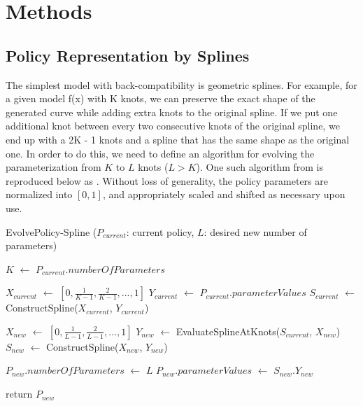 \section{Methods}

\subsection{Policy Representation by Splines}
The simplest model with back-compatibility is geometric
splines.  For example, for a given model f(x) with K knots, we can preserve the
exact shape of the generated curve while adding extra knots to the
original spline. If we put one additional knot between every two
consecutive knots of the original spline, we end up with a 2K - 1
knots and a spline that has the same shape as the original one. In
order to do this, we need to define an algorithm for evolving the
parameterization from $K$ to $L$ knots ($L > K$). One such algorithm from
\cite{kormushev2011bipedal-walking-energy} is reproduced below as .
Without loss of generality, the policy parameters are
normalized into $[0, 1]$, and appropriately scaled and shifted as necessary upon use.

\begin{algorithm}
\caption{EvolvePolicy-Spline ($P_{current}$: current policy, $L$: desired new number of parameters)}
\begin{algorithmic}[1]

\STATE $K$ $\leftarrow$ $P_{current}.numberOfParameters$

\STATE $X_{current}$ $\leftarrow$ $[0, \frac{1}{K-1}, \frac{2}{K-1}, ... , 1]$ %
\STATE $Y_{current}$ $\leftarrow$ $P_{current}.parameterValues$ %
\STATE $S_{current}$ $\leftarrow$ ConstructSpline($X_{current}$, $Y_{current}$) %

\STATE $X_{new}$ $\leftarrow$ $[0, \frac{1}{L-1}, \frac{2}{L-1}, ... , 1]$
\STATE $Y_{new}$ $\leftarrow$ EvaluateSplineAtKnots($S_{current}$, $X_{new}$)
\STATE $S_{new}$ $\leftarrow$ ConstructSpline($X_{new}$, $Y_{new}$)

\STATE $P_{new}.numberOfParameters$ $\leftarrow$ $L$
\STATE $P_{new}.parameterValues$ $\leftarrow$ $S_{new}$.$Y_{new}$

\STATE return $P_{new}$

\end{algorithmic}
\end{algorithm}



